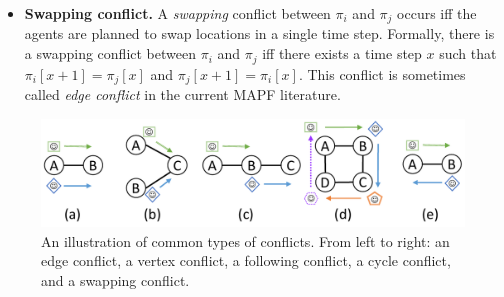 \documentclass[letterpaper]{article} %
\newcommand{\mapf}{\ac{MAPF}\xspace}
\newcommand{\comment}[1]{{\nb{\textbf{Comment:}}{orange}{#1}}}
\begin{document}
\begin{itemize}
\item \textbf{Swapping conflict.} A \emph{swapping} conflict between $\pi_i$ and $\pi_j$ occurs iff 
the agents are planned to swap locations in a single time step. 
Formally, there is a swapping conflict between $\pi_i$ and $\pi_j$ iff there exists a time step $x$ such that 
$\pi_i[x+1]=\pi_j[x]$ and $\pi_j[x+1]=\pi_i[x]$. This conflict is sometimes called \emph{edge conflict} in the current \mapf literature. 

\end{itemize}

\begin{figure}
    \centering
    \includegraphics[width=\columnwidth]{types-of-conflicts.pdf}
    \caption{An illustration of common types of conflicts. From left to right: an edge conflict, a vertex conflict, a following conflict, a cycle conflict, and a swapping conflict.}
    \label{fig:types-of-conflicts}
\end{figure}
\end{document}
